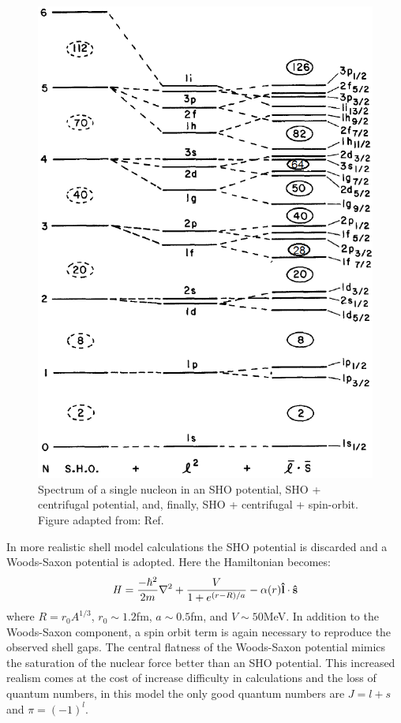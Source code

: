 \begin{figure}
\label{fig:chp2-shell-model}
\centerline{\includegraphics[height=0.45\textheight]{./img/c2/shell_model.png}}
	\caption{Spectrum of a single nucleon in an SHO potential, SHO + centrifugal potential, and, finally, SHO + centrifugal + spin-orbit. Figure adapted from: Ref.\cite{casten}}
\end{figure}

In more realistic shell model calculations the SHO potential is discarded and a Woods-Saxon potential is adopted. Here the Hamiltonian becomes:
\begin{equation}
\label{eqn:chp2-sm-ws-hamil}
\mathbf{\mathit{H}} = \frac{-\hbar^2}{2m}\nabla^2 + \frac{V}{1+e^{(r-R)/a}} - \alpha(r)\boldsymbol{\hat{\textbf{l}}}\cdot\boldsymbol{\hat{\textbf{s}}}
\end{equation}
where $R=r_0A^{1/3}$, $r_0\sim1.2$fm, $a\sim0.5$fm, and $V\sim50$MeV. In addition to the Woods-Saxon component, a spin orbit term is again necessary to reproduce the observed shell gaps. The central flatness of the Woods-Saxon potential mimics the saturation of the nuclear force better than an SHO potential. This increased realism comes at the cost of increase difficulty in calculations and the loss of quantum numbers, in this model the only good quantum numbers are $J=\mathit{l}+\mathit{s}$ and $\pi = (-1)^\mathit{l}$.

